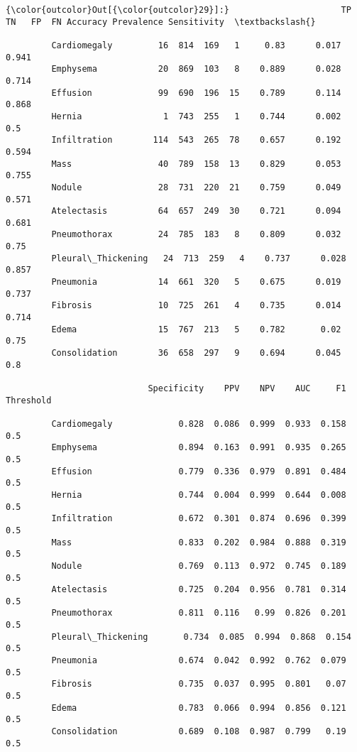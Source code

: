 \documentclass[11pt]{article}
\begin{document}
\begin{Verbatim}[commandchars=\\\{\}]
{\color{outcolor}Out[{\color{outcolor}29}]:}                      TP   TN   FP  FN Accuracy Prevalence Sensitivity  \textbackslash{}
                                                                                 
         Cardiomegaly         16  814  169   1     0.83      0.017       0.941   
         Emphysema            20  869  103   8    0.889      0.028       0.714   
         Effusion             99  690  196  15    0.789      0.114       0.868   
         Hernia                1  743  255   1    0.744      0.002         0.5   
         Infiltration        114  543  265  78    0.657      0.192       0.594   
         Mass                 40  789  158  13    0.829      0.053       0.755   
         Nodule               28  731  220  21    0.759      0.049       0.571   
         Atelectasis          64  657  249  30    0.721      0.094       0.681   
         Pneumothorax         24  785  183   8    0.809      0.032        0.75   
         Pleural\_Thickening   24  713  259   4    0.737      0.028       0.857   
         Pneumonia            14  661  320   5    0.675      0.019       0.737   
         Fibrosis             10  725  261   4    0.735      0.014       0.714   
         Edema                15  767  213   5    0.782       0.02        0.75   
         Consolidation        36  658  297   9    0.694      0.045         0.8   
         
                            Specificity    PPV    NPV    AUC     F1 Threshold  
                                                                               
         Cardiomegaly             0.828  0.086  0.999  0.933  0.158       0.5  
         Emphysema                0.894  0.163  0.991  0.935  0.265       0.5  
         Effusion                 0.779  0.336  0.979  0.891  0.484       0.5  
         Hernia                   0.744  0.004  0.999  0.644  0.008       0.5  
         Infiltration             0.672  0.301  0.874  0.696  0.399       0.5  
         Mass                     0.833  0.202  0.984  0.888  0.319       0.5  
         Nodule                   0.769  0.113  0.972  0.745  0.189       0.5  
         Atelectasis              0.725  0.204  0.956  0.781  0.314       0.5  
         Pneumothorax             0.811  0.116   0.99  0.826  0.201       0.5  
         Pleural\_Thickening       0.734  0.085  0.994  0.868  0.154       0.5  
         Pneumonia                0.674  0.042  0.992  0.762  0.079       0.5  
         Fibrosis                 0.735  0.037  0.995  0.801   0.07       0.5  
         Edema                    0.783  0.066  0.994  0.856  0.121       0.5  
         Consolidation            0.689  0.108  0.987  0.799   0.19       0.5  
\end{Verbatim}
            
\end{document}
